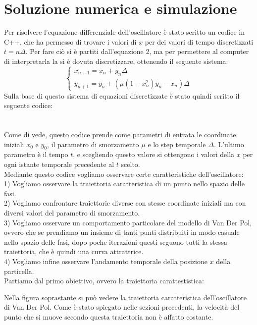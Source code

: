 \documentclass[12pt]{article}
\begin{document}
\section{Soluzione numerica e simulazione}
Per risolvere l'equazione differenziale dell'oscillatore è stato scritto un codice in C++, che ha permesso di trovare i valori di $x$ per dei valori di tempo discretizzati $t = n\Delta$. Per fare ciò si è partiti dall'equazione 2, ma per permettere al computer di interpretarla la si è dovuta discretizzare, ottenendo il seguente sistema:
\begin{equation}
	\begin{cases}
	x_{n+1} = x_n + y_n\Delta \\
	y_{n+1} = y_n + \left(\mu(1-x_n^2)y_n - x_n\right)\Delta
	\end{cases}
\end{equation} 
Sulla base di questo sistema di equazioni discretizzate è stato quindi scritto il seguente codice: \\ \\ \\
Come di vede, questo codice prende come parametri di entrata le coordinate iniziali $x_0$ e $y_0$, il parametro di smorzamento $\mu$ e lo step temporale $\Delta$. L'ultimo parametro è il tempo $t$, e scegliendo questo valore si ottengono i valori della $x$ per ogni istante temporale precedente al $t$ scelto. \\
	Mediante questo codice vogliamo osservare certe caratteristiche dell'oscillatore: \\
1) Vogliamo osservare la traiettoria caratteristica di un punto nello spazio delle fasi. \\
2) Vogliamo confrontare traiettorie diverse con stesse coordinate iniziali ma con diversi valori del parametro di smorzamento. \\
3) Vogliamo osservare un comportamento particolare del modello di Van Der Pol, ovvero che se prendiamo un insieme di tanti punti distribuiti in modo casuale nello spazio delle fasi, dopo poche iterazioni questi seguono tutti la stessa traiettoria, che è quindi una curva attrattrice. \\
4) Vogliamo infine osservare l'andamento temporale della posizione $x$ della particella. \\
Partiamo dal primo obiettivo, ovvero la traiettoria carattestistica: 
\begin{figure}[H]
	\centering
	\scalebox{0.9}{}
\end{figure}
Nella figura soprastante si può vedere la traiettoria caratteristica dell'oscillatore di Van Der Pol. Come è stato spiegato nelle sezioni precedenti, la velocità del punto che si muove secondo questa traiettoria non è affatto costante.
\end{document}
